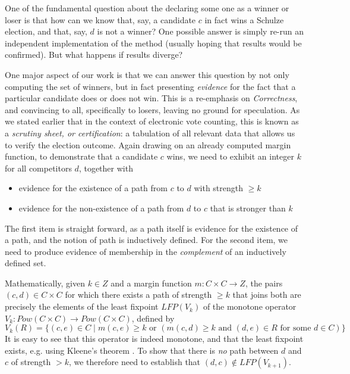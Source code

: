 \label{sec:prop-type}
One of the fundamental question about the declaring some one 
as a winner or loser is that 
how can we know that, say, a candidate $c$ in fact wins a
Schulze election, and that, say, $d$ is not a winner? One possible 
answer is simply  re-run an independent implementation of the method
(usually hoping that results would be confirmed). But what happens
if results diverge?  

One major aspect of our work is that we can answer this question
by not only computing the set of winners, but in fact presenting
\emph{evidence} for the fact that a particular
candidate does or does not
win. This is a re-emphasis on \emph{Correctness},
and convincing to all, specifically to losers, leaving  no ground for speculation. 
As we stated earlier that in the context of
electronic vote counting, this is known as a
\emph{scrutiny sheet, or certification}: a tabulation of all relevant data that allows
us to verify the election outcome.
Again drawing on an already computed margin function, to
demonstrate that a candidate $c$ wins, we need to exhibit an integer
$k$ for all competitors $d$, together with
\begin{itemize}
  \item evidence for the existence of a path from $c$ to $d$ with
  strength $\geq k$
  \item evidence for the non-existence of a path from $d$ to $c$
  that is stronger than $k$
\end{itemize}


\noindent
The first item is straight forward, as a path itself is evidence for the
existence of a path, and the notion of path is inductively defined.
For the second item, we need to produce evidence of membership in
the \emph{complement} of an inductively defined set.

Mathematically, given $k \in Z$ and a margin function $m: C \times C
\to Z$, the pairs $(c, d) \in C \times C$ for which there exists a
path of strength $\geq k$ that joins both are precisely the elements
of the least fixpoint $LFP(V_k)$ of the monotone operator $V_k:
Pow(C \times C) \to Pow(C \times C)$, defined by
\[ V_k(R) = \lbrace (c, e) \in C \mid m(c, e) \geq k \mbox{ or }
(m(c, d) \geq k \mbox{ and } (d, e) \in R \mbox{ for some } d \in C)
\rbrace \]
It is easy to see that this operator is indeed monotone, and that
the least fixpoint exists, e.g. using Kleene's theorem
\citep{Stoltenberg-Hansen:1994:MTD}.  To show that there is \emph{no}
path between $d$ and $c$ of strength $> k$, we therefore need to
establish that
$(d, c) \notin LFP(V_{k+1})$.

